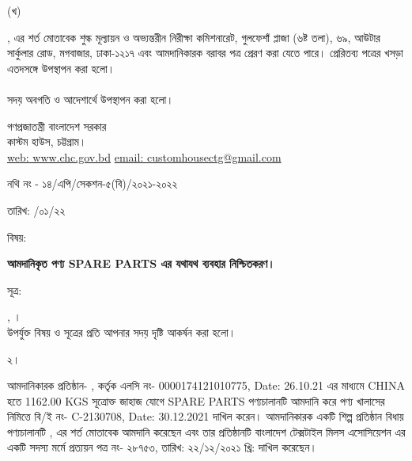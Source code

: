 \documentclass[12pt]{article}
\newcommand{\fileno}{নথি নং - ১৪/এপি/সেকশন-৫(বি)/২০২১-২০২২}
\newcommand{\fdt}{\hspace*{3em} তারিখ: \hspace{2.4em} /০১/২২}
\newcommand{\beno}{C-2130708}
\newcommand{\bedt}{30.12.2021}
\newcommand{\lcno}{0000174121010775}
\newcommand{\lcdt}{26.10.21}
\newcommand{\good}{SPARE PARTS}
\newcommand{\pkg}{1162.00 KGS}
\newcommand{\co}{CHINA}
\newcommand{\impn}{\jsml}
\newcommand{\impadd}{\jsmla}
\newcommand{\btmaltno}{প্রত্যয়ন পত্র নং- ২৮৭৫৩}
\newcommand{\btmaltnodt}{তারিখ:  ২২/১২/২০২১ খ্রি:}
\begin{document}
\begin{minipage}[t]{0.05\linewidth}
(খ)
\end{minipage}
\begin{minipage}[t]{0.90\linewidth}
{\srootz}, {\srootzd} এর শর্ত মোতাবেক
শুল্ক মূল্যায়ন ও অভ্যন্তরীন নিরীক্ষা কমিশনারেট,
গুলফেশাঁ প্লাজা (৬ষ্ট তলা), ৬৯, আউটার
সার্কুলার রোড, মগবাজার, ঢাকা-১২১৭ এবং
আমদানিকারক বরাবর পত্র প্রেরণ করা যেতে পারে।
প্রেরিতব্য পত্রের খসড়া এতদসঙ্গে উপস্থাপন করা হলো।
\\
\\
সদয় অবগতি ও আদেশার্থে উপস্থাপন করা
হলো।
\end{minipage}

\newpage
\begin{center}
\vspace*{6MM}
গণপ্রজাতন্ত্রী বাংলাদেশ সরকার
\\
\footnotesize{কাস্টম হাউস, চট্টগ্রাম।}
\\
\href{}{web: www.chc.gov.bd}\hspace{1em}
\href{}{email: customhousectg@gmail.com}
\end{center}
\begin{minipage}[t]{.70\linewidth}
{\fileno}
\end{minipage}
\begin{minipage}[t]{.30\linewidth}
{\fdt}
\\
\end{minipage}
\begin{minipage}[t]{.07\linewidth}
বিষয়:
\end{minipage}
\begin{minipage}[t]{.93\linewidth}
\textbf{আমদানিকৃত পণ্য {\good} এর যথাযথ ব্যবহার নিশ্চিতকরণ।}
\end{minipage}
\begin{minipage}[t]{.07\linewidth}
সূত্র:
\end{minipage}
\begin{minipage}[t]{.93\linewidth}
{\srootz}, {\srootzd}।
\\
উপর্যুক্ত বিষয় ও সূত্রের প্রতি আপনার সদয় দৃষ্টি
আকর্ষন করা হলো।
\\
\end{minipage}
\begin{minipage}[t]{.07\linewidth}
২।
\end{minipage}
\begin{minipage}[t]{.93\linewidth}
আমদানিকারক প্রতিষ্ঠান- {\impn}, {\impadd}
কর্তৃক এলসি নং- {\lcno}, Date: {\lcdt}
এর মাধ্যমে {\co} হতে
{\pkg} সূত্রোক্ত জাহাজ যোগে {\good}
পণ্যচালানটি আমদানি করে পণ্য
খালাসের নিমিত্তে বি/ই নং- {\beno}, Date: {\bedt}
দাখিল করেন। আমদানিকারক একটি
শিল্প প্রতিষ্ঠান বিধায় পণ্যচালানটি
{\srootz}, {\srootzd}
এর শর্ত মোতাবেক আমদানি করেছেন এবং
তার প্রতিষ্ঠানটি বাংলাদেশ টেক্সটাইল মিলস
এসোসিয়েশন এর একটি সদস্য মর্মে
{\btmaltno}, {\btmaltnodt}
দাখিল করেছেন।
\\
\end{minipage}
\end{document}
